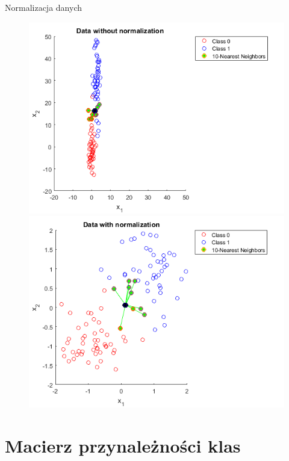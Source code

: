\documentclass{beamer}
\begin{document}
\begin{frame}{Normalizacja danych}
\begin{figure}[!tbp]
  \centering
  \begin{minipage}[b]{0.45\textwidth}
    \includegraphics[width=\textwidth]{knn-ns.png}
  \end{minipage}
  \hfill
  \begin{minipage}[b]{0.45\textwidth}
    \includegraphics[width=\textwidth]{knn-s.png}
  \end{minipage}
\end{figure}
\end{frame}


\section{Macierz przynależności klas}
\end{document}
